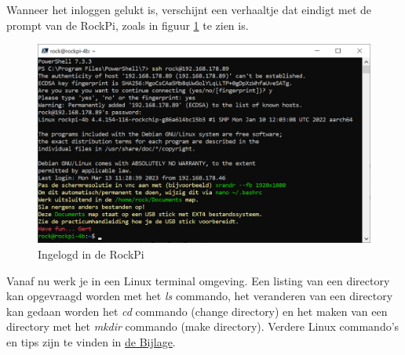 \clearpage
Wanneer het inloggen gelukt is, verschijnt een verhaaltje dat eindigt met de prompt van de RockPi, zoals in figuur \ref{fig:rockpiLogIn} te zien is.
\begin{figure}[h!]
	\centering
	\begin{center} 	
		\includegraphics[width=1\textwidth]{figuren/ingelogtRockPi}
		\caption{Ingelogd in de RockPi}
		\label{fig:rockpiLogIn}   
	\end{center}
\end{figure}
Vanaf nu werk je in een Linux terminal omgeving. Een listing van een directory kan opgevraagd worden met het \textit{ls} commando, het veranderen van een directory kan gedaan worden het \textit{cd} commando (change directory) en het maken van een directory met het \textit{mkdir}  commando (make directory). Verdere Linux commando's en tips zijn te vinden in  \hyperlink{LinuxTipsTrics}{de Bijlage}.

\clearpage
